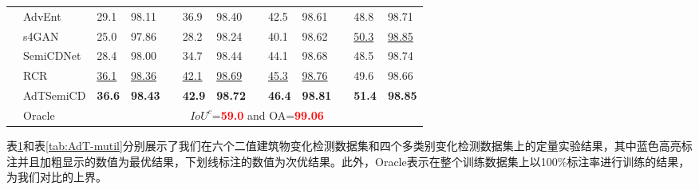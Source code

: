\documentclass[lang=chs, degree=master, blindreview=false, adobe=false]{yanputhesis}
\begin{document}
\begin{table}[!htbp]
{\begin{tabular}{p{20mm}p{25mm}p{8mm}p{8mm}cp{8mm}p{8mm}cp{8mm}p{8mm}cp{8mm}p{8mm}}
      & AdvEnt\cite{vu2019advent}& 29.1 & 98.11 && 36.9 & 98.40 && 42.5 & 98.61 && 48.8 & 98.71 \\ %
      & s4GAN\cite{mittal2019semi}& 25.0 & 97.86 && 28.2 & 98.24 && 40.1 & 98.62 && \underline{50.3} & \underline{98.85} \\
      & SemiCDNet\cite{peng2021SemiCDNet} & 28.4 & 98.00 && 34.7 & 98.44 && 44.1 & 98.68 && 48.5 & 98.74 \\ %
      & RCR\cite{bandara2022RCR}& \underline{36.1} & \underline{98.36} && \underline{42.1} & \underline{98.69} && \underline{45.3} & \underline{98.76} && 49.6 & 98.66 \\
      \rowcolor{mycyan}
      \multirow{-8}{*}{\cellcolor{white}}& \cellcolor{white}AdTSemiCD   &  \textbf{36.6} & \cellcolor{mycyan}\textbf{98.43} && \textbf{42.9} & \textbf{98.72} && \textbf{46.4} & \textbf{98.81} && \textbf{51.4} & \textbf{98.85} \\%
      \cline{2-13}
      & Oracle & \multicolumn{11}{c}{$ IoU^c$=\textcolor{red}{\bf 59.0} and OA=\textcolor{red}{\bf 99.06}} \\
      \bottomrule
  \end{tabular}
  }
  \label{tab:AdT-building}
\end{table}
表\ref{tab:AdT-building}和表\ref{tab:AdT-mutil}分别展示了我们在六个二值建筑物变化检测数据集和四个多类别变化检测数据集上的定量实验结果，其中蓝色高亮标注并且加粗显示的数值为最优结果，下划线标注的数值为次优结果。此外，Oracle表示在整个训练数据集上以100$\%$标注率进行训练的结果，为我们对比的上界。
\end{document}
